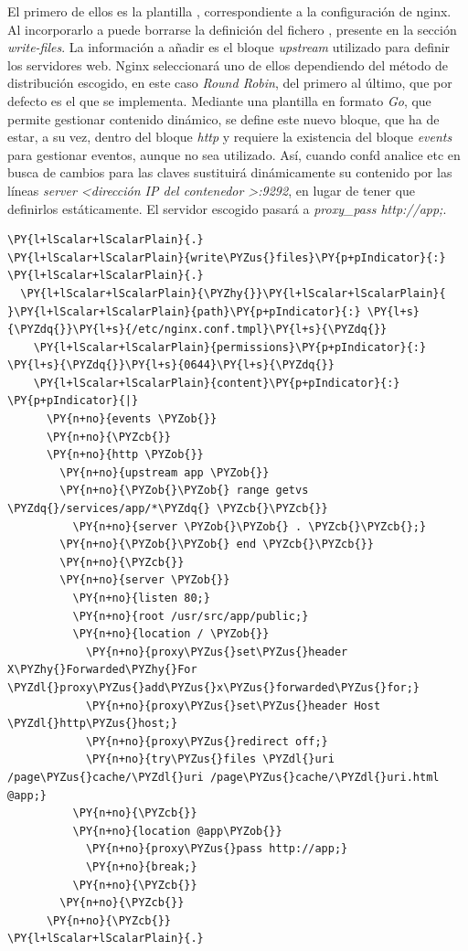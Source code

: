 El primero de ellos es la plantilla , correspondiente a la configuración de nginx. Al incorporarlo a  puede borrarse la definición del fichero , presente en la sección \textit{write-files}. La información a añadir es el bloque \textit{upstream} utilizado para definir los servidores web. Nginx seleccionará uno de ellos dependiendo del método de distribución escogido, en este caso \textit{Round Robin}, del primero al último, que por defecto es el que se implementa. Mediante una plantilla en formato \textit{Go}, que permite gestionar contenido dinámico, se define este nuevo bloque, que ha de estar, a su vez, dentro del bloque \textit{http} y requiere la existencia del bloque \textit{events} para gestionar eventos, aunque no sea utilizado. Así, cuando confd analice etc en busca de cambios para las claves  sustituirá dinámicamente su contenido por las líneas \textit{server <dirección IP del contenedor >:9292}, en lugar de tener que definirlos estáticamente. El servidor escogido pasará a \textit{proxy\_pass http://app;}.

\begin{codelisting}
\label{code:nginx.conf.tmpl}
\begin{Verbatim}[fontsize=\relsize{-2.5},fontseries=b,commandchars=\\\{\}]
\PY{l+lScalar+lScalarPlain}{.}
\PY{l+lScalar+lScalarPlain}{write\PYZus{}files}\PY{p+pIndicator}{:}
\PY{l+lScalar+lScalarPlain}{.}
  \PY{l+lScalar+lScalarPlain}{\PYZhy{}}\PY{l+lScalar+lScalarPlain}{ }\PY{l+lScalar+lScalarPlain}{path}\PY{p+pIndicator}{:} \PY{l+s}{\PYZdq{}}\PY{l+s}{/etc/nginx.conf.tmpl}\PY{l+s}{\PYZdq{}}
    \PY{l+lScalar+lScalarPlain}{permissions}\PY{p+pIndicator}{:} \PY{l+s}{\PYZdq{}}\PY{l+s}{0644}\PY{l+s}{\PYZdq{}}
    \PY{l+lScalar+lScalarPlain}{content}\PY{p+pIndicator}{:} \PY{p+pIndicator}{|}
      \PY{n+no}{events \PYZob{}}
      \PY{n+no}{\PYZcb{}}
      \PY{n+no}{http \PYZob{}}
        \PY{n+no}{upstream app \PYZob{}}
        \PY{n+no}{\PYZob{}\PYZob{} range getvs \PYZdq{}/services/app/*\PYZdq{} \PYZcb{}\PYZcb{}}
          \PY{n+no}{server \PYZob{}\PYZob{} . \PYZcb{}\PYZcb{};}
        \PY{n+no}{\PYZob{}\PYZob{} end \PYZcb{}\PYZcb{}}
        \PY{n+no}{\PYZcb{}}
        \PY{n+no}{server \PYZob{}}
          \PY{n+no}{listen 80;}
          \PY{n+no}{root /usr/src/app/public;}
          \PY{n+no}{location / \PYZob{}}
            \PY{n+no}{proxy\PYZus{}set\PYZus{}header X\PYZhy{}Forwarded\PYZhy{}For \PYZdl{}proxy\PYZus{}add\PYZus{}x\PYZus{}forwarded\PYZus{}for;}
            \PY{n+no}{proxy\PYZus{}set\PYZus{}header Host \PYZdl{}http\PYZus{}host;}
            \PY{n+no}{proxy\PYZus{}redirect off;}
            \PY{n+no}{try\PYZus{}files \PYZdl{}uri /page\PYZus{}cache/\PYZdl{}uri /page\PYZus{}cache/\PYZdl{}uri.html @app;}
          \PY{n+no}{\PYZcb{}}
          \PY{n+no}{location @app\PYZob{}}
            \PY{n+no}{proxy\PYZus{}pass http://app;}
            \PY{n+no}{break;}
          \PY{n+no}{\PYZcb{}}
        \PY{n+no}{\PYZcb{}}
      \PY{n+no}{\PYZcb{}}
\PY{l+lScalar+lScalarPlain}{.}
\end{Verbatim}
\end{codelisting}

